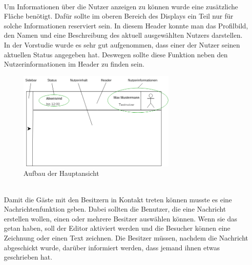 \\
Um Informationen über die Nutzer anzeigen zu können wurde eine zusätzliche Fläche benötigt. Dafür sollte im oberen Bereich des Displays ein Teil nur für solche Informationen reserviert sein. In diesem Header konnte man das Profilbild, den Namen und eine Beschreibung des aktuell ausgewählten Nutzers darstellen.
In der Vorstudie wurde es sehr gut aufgenommen, dass einer der Nutzer seinen aktuellen Status angegeben hat. Deswegen sollte diese Funktion neben den Nutzerinformationen im Header zu finden sein.
\begin{figure}[h!]
  \centering
    \includegraphics[width=0.7\textwidth]{./img/MainViewAufbau.png}
  \caption{Aufbau der Hauptansicht}
  \label{img:mainView}
\end{figure}
\\
Damit die Gäste mit den Besitzern in Kontakt treten können musste es eine Nachrichtenfunktion geben. Dabei sollten die Benutzer, die eine Nachricht erstellen wollen, einen oder mehrere Besitzer auswählen können. Wenn sie das getan haben, soll der Editor aktiviert werden und die Besucher können eine Zeichnung oder einen Text zeichnen. Die Besitzer müssen, nachdem die Nachricht abgeschickt wurde, darüber informiert werden, dass jemand ihnen etwas geschrieben hat.

